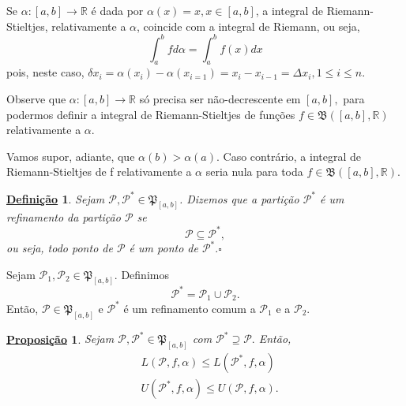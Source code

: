 \documentclass{article}
\newtheorem*{def*}{\underline{Defini\c c\~ao}}
\newtheorem*{prop*}{\underline{Proposi\c c\~ao}}
\begin{document}
 Se \(\alpha :[a, b]\rightarrow \mathbb{R}\) é dada por \(\alpha (x) = x, x\in[a, b]\), a integral de Riemann-Stieltjes, relativamente a \(\alpha \), coincide
com a integral de Riemann, ou seja, 
  \[
    \int_{a}^{b}f d\alpha = \int_{a}^{b}f(x)dx
  \]
  pois, neste caso, \(\delta x_{i}=\alpha (x_{i}) - \alpha (x_{i=1}) = x_{i} - x_{i-1} = \Delta x_{i}, 1\leq i\leq n\).

  Observe que \(\alpha :[a, b]\rightarrow \mathbb{R}\) só precisa ser não-decrescente em \([a, b],\) para
  podermos definir a integral de Riemann-Stieltjes de fun\c cões \(f\in \mathfrak{B}([a, b], \mathbb{R})\) relativamente a \(\alpha .\)

  Vamos supor, adiante, que \(\alpha (b) > \alpha (a).\) Caso contrário, a integral de Riemann-Stieltjes de f 
  relativamente a \(\alpha \) seria nula para toda \(f\in \mathfrak{B}([a, b], \mathbb{R})\).
 \begin{def*}
   Sejam \(\mathcal{P}, \mathcal{P}^{*}\in \mathfrak{P}_{[a, b]}\). Dizemos que a parti\c cão \(\mathcal{P}^{*}\) é um
   refinamento da parti\c cão \(\mathcal{P}\) se 
     \[
       \mathcal{P}\subseteq{\mathcal{P}^{*},}
     \]
     ou seja, todo ponto de \(\mathcal{P}\) é um ponto de \(\mathcal{P}^{*}. \square\) 
 \end{def*}
 Sejam \(\mathcal{P}_{1}, \mathcal{P}_{2}\in \mathfrak{P}_{[a, b]}.\) Definimos 
   \[
     \mathcal{P}^{*} = \mathcal{P}_{1}\cup \mathcal{P}_{2}.
   \]
   Então, \(\mathcal{P}\in \mathfrak{P}_{[a, b]}\) e \(\mathcal{P}^{*}\) é um refinamento comum
   a \(\mathcal{P}_{1}\) e a \(\mathcal{P}_{2}.\)
  \begin{prop*}
    Sejam \(\mathcal{P}, \mathcal{P}^{*}\in \mathfrak{P}_{[a, b]}\) com \(\mathcal{P}^{*}\supseteq{\mathcal{P}.}\) Então, 
   \begin{align*}
     &L(\mathcal{P}, f, \alpha )\leq L(\mathcal{P}^{*}, f, \alpha )\\
     &U(\mathcal{P}^{*}, f, \alpha )\leq U(\mathcal{P}, f, \alpha ).
   \end{align*}
  \end{prop*}
\end{document}
